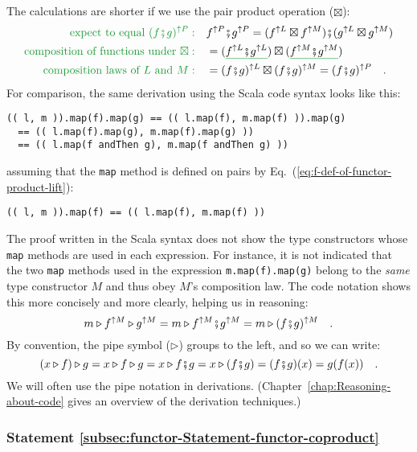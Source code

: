 The calculations are shorter if we use the pair product operation
($\boxtimes$):
\begin{align*}
{\color{greenunder}\text{expect to equal }(f\bef g)^{\uparrow P}:}\quad & f^{\uparrow P}\bef g^{\uparrow P}=(f^{\uparrow L}\boxtimes f^{\uparrow M})\bef(g^{\uparrow L}\boxtimes g^{\uparrow M})\\
{\color{greenunder}\text{composition of functions under }\boxtimes:}\quad & =(\gunderline{f^{\uparrow L}\bef g^{\uparrow L}})\boxtimes(\gunderline{f^{\uparrow M}\bef g^{\uparrow M}})\\
{\color{greenunder}\text{composition laws of }L\text{ and }M:}\quad & =(f\bef g)^{\uparrow L}\boxtimes(f\bef g)^{\uparrow M}=(f\bef g)^{\uparrow P}\quad.
\end{align*}
For comparison, the same derivation using the Scala code syntax looks
like this:
\begin{lstlisting}
(( l, m )).map(f).map(g) == (( l.map(f), m.map(f) )).map(g)
  == (( l.map(f).map(g), m.map(f).map(g) ))
  == (( l.map(f andThen g), m.map(f andThen g) )) 
\end{lstlisting}
assuming that the \lstinline!map! method is defined on pairs by Eq.~(\ref{eq:f-def-of-functor-product-lift}):
\begin{lstlisting}
(( l, m )).map(f) == (( l.map(f), m.map(f) ))
\end{lstlisting}
The proof written in the Scala syntax does not show the type constructors
whose \lstinline!map! methods are used in each expression. For instance,
it is not indicated that the two \lstinline!map! methods used in
the expression \lstinline!m.map(f).map(g)! belong to the \emph{same}
type constructor $M$ and thus obey $M$\textsf{'}s composition law. The code
notation shows this more concisely and more clearly, helping us in
reasoning:
\[
m\triangleright f^{\uparrow M}\triangleright g^{\uparrow M}=m\triangleright f^{\uparrow M}\bef g^{\uparrow M}=m\triangleright(f\bef g)^{\uparrow M}\quad.
\]
By convention, the pipe symbol ($\triangleright$) groups to the left,
and so we can write:
\[
\left(x\triangleright f\right)\triangleright g=x\triangleright f\triangleright g=x\triangleright f\bef g=x\triangleright(f\bef g)=(f\bef g)(x)=g(f(x))\quad.
\]
We will often use the pipe notation in derivations. (Chapter~\ref{chap:Reasoning-about-code}
gives an overview of the derivation techniques.)

\subsubsection{Statement \label{subsec:functor-Statement-functor-coproduct}\ref{subsec:functor-Statement-functor-coproduct}}

